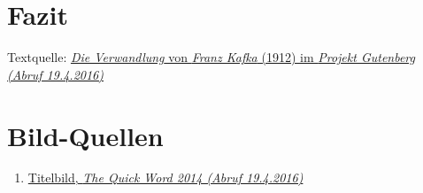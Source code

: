 \documentclass[12pt,a4paper,twoside,titlepage]{article}
\begin{document}
	
	
	\section{Fazit}
	
	
	
	\begin{thebibliography}{9}
		 Textquelle: \href{http://gutenberg.spiegel.de/buch/die-verwandlung-165/1}{\textit{Die Verwandlung} von \textit{Franz Kafka} (1912) im \textit{Projekt Gutenberg (Abruf 19.4.2016)}}
		
%			
	\end{thebibliography}
	
	\section*{Bild-Quellen}
	\begin{enumerate}
		\item \label{qui14} \href{https://thequickword.wordpress.com/2014/01/28/dyslexicatheist-book-review-franz-kafka-the-metamorphosis-die-verwandlung/}{Titelbild, \textit{The Quick Word 2014 (Abruf 19.4.2016)}}
	\end{enumerate}
	
	
	
	
\end{document}
